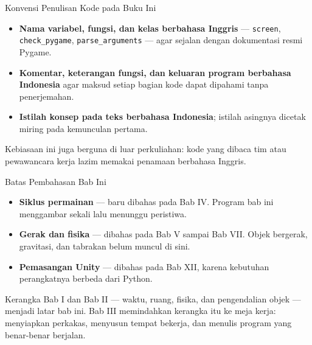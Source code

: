 \documentclass[aspectratio=169,10pt]{beamer}
\begin{document}
\begin{frame}{Konvensi Penulisan Kode pada Buku Ini}
\begin{itemize}
  \item \textbf{Nama variabel, fungsi, dan kelas berbahasa Inggris} ---
        \texttt{screen}, \texttt{check\_pygame}, \texttt{parse\_arguments} ---
        agar sejalan dengan dokumentasi resmi Pygame.
  \item \textbf{Komentar, keterangan fungsi, dan keluaran program berbahasa
        Indonesia} agar maksud setiap bagian kode dapat dipahami tanpa
        penerjemahan.
  \item \textbf{Istilah konsep pada teks berbahasa Indonesia}; istilah asingnya
        dicetak miring pada kemunculan pertama.
\end{itemize}
\vspace{0.2cm}
\begin{kiat}
Kebiasaan ini juga berguna di luar perkuliahan: kode yang dibaca tim atau
pewawancara kerja lazim memakai penamaan berbahasa Inggris.
\end{kiat}
\end{frame}

\begin{frame}{Batas Pembahasan Bab Ini}
\begin{itemize}
  \item \textbf{Siklus permainan} --- baru dibahas pada Bab IV. Program bab ini
        menggambar sekali lalu menunggu peristiwa.
  \item \textbf{Gerak dan fisika} --- dibahas pada Bab V sampai Bab VII. Objek
        bergerak, gravitasi, dan tabrakan belum muncul di sini.
  \item \textbf{Pemasangan Unity} --- dibahas pada Bab XII, karena kebutuhan
        perangkatnya berbeda dari Python.
\end{itemize}
\vspace{0.2cm}
\begin{kotak}
Kerangka Bab I dan Bab II --- waktu, ruang, fisika, dan pengendalian objek ---
menjadi latar bab ini. Bab III memindahkan kerangka itu ke meja kerja: menyiapkan
perkakas, menyusun tempat bekerja, dan menulis program yang benar-benar berjalan.
\end{kotak}
\end{frame}

\end{document}
